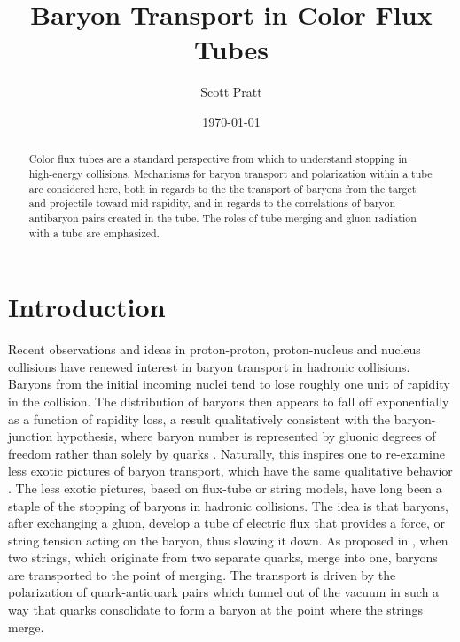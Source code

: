 \documentclass[aps, prc, 12pt, nofootinbib, showpacs, superscriptaddress, tightenlines, groupedaddress]{revtex4-2}
\begin{document}
\title{Baryon Transport in Color Flux Tubes}
\author{Scott Pratt}
\date{\today}

\pacs{}

\begin{abstract}
Color flux tubes are a standard perspective from which to understand stopping in high-energy collisions. Mechanisms for baryon transport and polarization within a tube are considered here, both in regards to the the transport of baryons from the target and projectile toward mid-rapidity, and in regards to the correlations of baryon-antibaryon pairs created in the tube. The roles of tube merging and gluon radiation with a tube are emphasized.
\end{abstract}

\maketitle

\section{Introduction}

Recent observations and ideas in proton-proton, proton-nucleus and nucleus collisions have renewed interest in baryon transport in hadronic collisions\cite{Brandenburg:2022hrp,STAR:2008med,STAR:2017sal,BRAHMS:2003wwg}. Baryons from the initial incoming nuclei tend to lose roughly one unit of rapidity in the collision. The distribution of baryons then appears to fall off exponentially as a function of rapidity loss, a result qualitatively consistent with the baryon-junction hypothesis, where baryon number is represented by gluonic degrees of freedom rather than solely by quarks \cite{Kharzeev:1996sq}. Naturally, this inspires one to re-examine less exotic pictures of baryon transport, which have the same qualitative behavior \cite{Vance:1997th}. The less exotic pictures, based on flux-tube or string models, have long been a staple of the stopping of baryons in hadronic collisions. The idea is that baryons, after exchanging a gluon, develop a tube of electric flux that provides a force, or string tension acting on the baryon, thus slowing it down. As proposed in \cite{Vance:1997th}, when two strings, which originate from two separate quarks, merge into one, baryons are transported to the point of merging. The transport is driven by the polarization of quark-antiquark pairs which tunnel out of the vacuum in such a way that quarks consolidate to form a baryon at the point where the strings merge.
\end{document}
